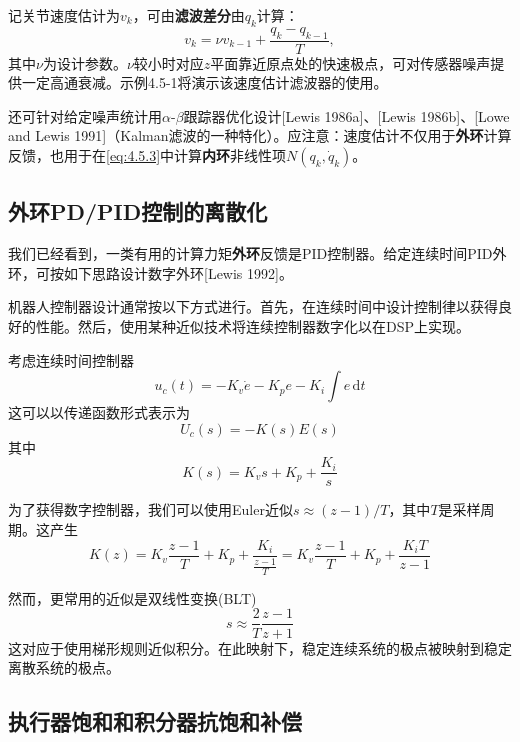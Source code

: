 \documentclass[UTF8]{ctexart}
\theoremstyle{definition}
\newcommand{\dd}{\mathrm{d}}
\begin{document}
记关节速度估计为$v_k$，可由\textbf{滤波差分}由$q_k$计算：
\begin{equation}\label{eq:4.5.7}
    v_k=\nu v_{k-1}+\frac{q_k-q_{k-1}}{T},
\end{equation}
其中$\nu$为设计参数。$\nu$较小时对应$z$平面靠近原点处的快速极点，可对传感器噪声提供一定高通衰减。示例4.5-1将演示该速度估计滤波器的使用。

还可针对给定噪声统计用$\alpha$-$\beta$跟踪器优化设计[Lewis 1986a]、[Lewis 1986b]、[Lowe and Lewis 1991]（Kalman滤波的一种特化）。应注意：速度估计不仅用于\textbf{外环}计算反馈，也用于在\eqref{eq:4.5.3}中计算\textbf{内环}非线性项$N(q_k,\dot{q}_k)$。

\subsection{外环PD/PID控制的离散化}

我们已经看到，一类有用的计算力矩\textbf{外环}反馈是PID控制器。给定连续时间PID外环，可按如下思路设计数字外环[Lewis 1992]。

机器人控制器设计通常按以下方式进行。首先，在连续时间中设计控制律以获得良好的性能。然后，使用某种近似技术将连续控制器数字化以在DSP上实现。

考虑连续时间控制器
\begin{equation}\label{eq:4.5.8}
    u_c(t) = -K_v\dot{e} - K_pe - K_i\int e\,\dd t
\end{equation}
这可以以传递函数形式表示为
\begin{equation}\label{eq:4.5.9}
    U_c(s) = -K(s)E(s)
\end{equation}
其中
\begin{equation}\label{eq:4.5.10}
    K(s) = K_vs + K_p + \frac{K_i}{s}
\end{equation}

为了获得数字控制器，我们可以使用Euler近似$s \approx (z - 1)/T$，其中$T$是采样周期。这产生
\begin{equation}\label{eq:4.5.11}
    K(z) = K_v\frac{z - 1}{T} + K_p + \frac{K_i}{\frac{z - 1}{T}} = K_v\frac{z - 1}{T} + K_p + \frac{K_iT}{z - 1}
\end{equation}

然而，更常用的近似是双线性变换(BLT)
\begin{equation}\label{eq:4.5.12}
    s \approx \frac{2}{T}\frac{z - 1}{z + 1}
\end{equation}
这对应于使用梯形规则近似积分。在此映射下，稳定连续系统的极点被映射到稳定离散系统的极点。

\subsection{执行器饱和和积分器抗饱和补偿}
\end{document}
